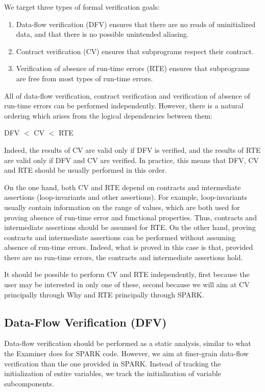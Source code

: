 \documentclass{article}
\newcounter{example}
\begin{document}
We target three types of formal verification goals:
\begin{enumerate}
\item Data-flow verification (DFV) ensures that there are no reads of
  uninitialized data, and that there is no possible unintended aliasing.
\item Contract verification (CV) ensures that subprograms respect their
  contract.
\item Verification of absence of run-time errors (RTE) ensures that subprograms
  are free from most types of run-time errors.
\end{enumerate}

All of data-flow verification, contract verification and verification of
absence of run-time errors can be performed independently. However, there is a
natural ordering which arises from the logical dependencies between them: 
\begin{center}
  DFV $<$ CV $<$ RTE
\end{center}

Indeed, the results of CV are valid only if DFV is verified, and the results of
RTE are valid only if DFV and CV are verified. In practice, this means that
DFV, CV and RTE should be usually performed in this order.

On the one hand, both CV and RTE depend on contracts and intermediate
assertions (loop-invariants and other assertions). For example, loop-invariants
usually contain information on the range of values, which are both used for
proving absence of run-time error and functional properties. Thus, contracts
and intermediate assertions should be assumed for RTE. On the other hand,
proving contracts and intermediate assertions can be performed without assuming
absence of run-time errors. Indeed, what is proved in this case is that,
provided there are no run-time errors, the contracts and intermediate
assertions hold.

It should be possible to perform CV and RTE independently, first because the
user may be interested in only one of these, second because we will aim at CV
principally through Why and RTE principally through SPARK.

\subsection{Data-Flow Verification (DFV)}
\label{sub:DFV}

Data-flow verification should be performed as a static analysis, similar to
what the Examiner does for SPARK code. However, we aim at finer-grain data-flow
verification than the one provided in SPARK. Instead of tracking the
initialization of entire variables, we track the initialization of variable
subcomponents.
\end{document}
